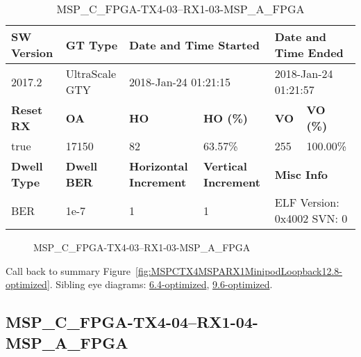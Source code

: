\begin{table}[h]
\centering
\caption{MSP\_C\_FPGA-TX4-03--RX1-03-MSP\_A\_FPGA}
\label{tab:MSPCFPGATX403RX103MSPAFPGA12.8-optimized}
\begin{tabular}{@{}|l|l|l|l|l|l|@{}}
\toprule
\textbf{SW Version}                & \textbf{GT Type}   & \multicolumn{2}{l|}{\textbf{Date and Time Started}}            & \multicolumn{2}{l|}{\textbf{Date and Time Ended}}        \\ \midrule
2017.2                       & UltraScale GTY          & \multicolumn{2}{l|}{2018-Jan-24 01:21:15}                   & \multicolumn{2}{l|}{2018-Jan-24 01:21:57}               \\ \midrule
\textbf{Reset RX}                  & \textbf{OA} & \textbf{HO}   & \textbf{HO (\%)} & \textbf{VO} & \textbf{VO (\%)} \\ \midrule
true & 17150        & 82          & 63.57\%        & 255        & 100.00\%       \\ \midrule
\textbf{Dwell Type}                & \textbf{Dwell BER} & \textbf{Horizontal Increment} & \textbf{Vertical Increment}    & \multicolumn{2}{l|}{\textbf{Misc Info}}                  \\ \midrule
BER                            & 1e-7        & 1        & 1           & \multicolumn{2}{l|}{ELF Version: 0x4002 SVN: 0}                         \\ \bottomrule
\end{tabular}
\end{table}

\begin{figure}[h]
\caption{MSP\_C\_FPGA-TX4-03--RX1-03-MSP\_A\_FPGA} \label{fig:MSPCFPGATX403RX103MSPAFPGA12.8-optimized}
\end{figure}

Call back to summary Figure~\ref{fig:MSPCTX4MSPARX1MinipodLoopback12.8-optimized}.
Sibling eye diagrams: \hyperref[sec:MSPCFPGATX403RX103MSPAFPGA6.4-optimized]{6.4-optimized}, \hyperref[sec:MSPCFPGATX403RX103MSPAFPGA9.6-optimized]{9.6-optimized}.

\clearpage
\newpage


\subsection{MSP\_C\_FPGA-TX4-04--RX1-04-MSP\_A\_FPGA}\label{sec:MSPCFPGATX404RX104MSPAFPGA12.8-optimized}

